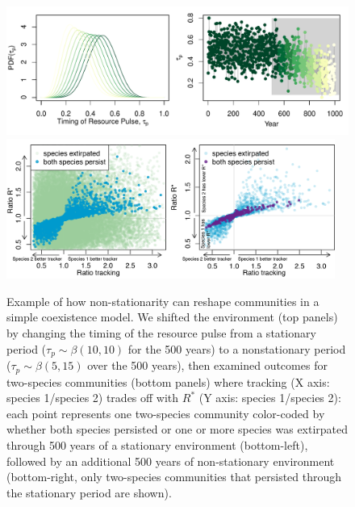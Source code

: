 \documentclass[11pt,letterpaper]{article}
\begin{document}
\begin{figure}[h!]
\centering
\includegraphics[width=1\textwidth]{..//..//..//R/graphs/modelruns/manuscript/modelsuppAlt.pdf}
\includegraphics[width=0.96\textwidth]{..//..//..//R/graphs/modelruns/manuscript/alpharstar_2panelwide_adj.png}
\caption{Example of how non-stationarity can reshape communities in a simple coexistence model. We shifted the environment (top panels) by changing the timing of the resource pulse from a stationary period ($\tau_{p} \sim \beta(10,10)$ for the 500 years) to a nonstationary period ($\tau_{p}\sim \beta(5,15)$ over the 500 years), then examined outcomes for two-species communities (bottom panels) where tracking (X axis: species 1/species 2) trades off with $R^*$ (Y axis: species 1/species 2): each point represents one two-species community color-coded by whether both species persisted or one or more species was extirpated through 500 years of a stationary environment (bottom-left), followed by an additional 500 years of non-stationary environment (bottom-right, only two-species communities that persisted through the stationary period are shown).}
\label{fig:modelfig} 
\end{figure}
\end{document}

